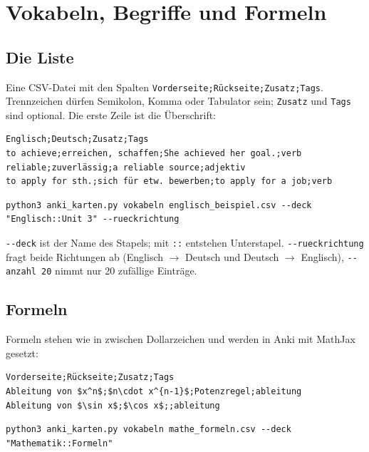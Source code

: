 \section{Vokabeln, Begriffe und Formeln}


\subsection{Die Liste}

Eine CSV-Datei mit den Spalten \texttt{Vorderseite;Rückseite;Zusatz;Tags}. Trennzeichen dürfen Semikolon, Komma oder Tabulator sein; \texttt{Zusatz} und \texttt{Tags} sind optional. Die erste Zeile ist die Überschrift:

\begin{lstlisting}[style=latex]
Englisch;Deutsch;Zusatz;Tags
to achieve;erreichen, schaffen;She achieved her goal.;verb
reliable;zuverlässig;a reliable source;adjektiv
to apply for sth.;sich für etw. bewerben;to apply for a job;verb
\end{lstlisting}

\begin{lstlisting}[style=latex]
python3 anki_karten.py vokabeln englisch_beispiel.csv --deck "Englisch::Unit 3" --rueckrichtung
\end{lstlisting}

\texttt{-{}-deck} ist der Name des Stapels; mit \texttt{::} entstehen Unterstapel. \texttt{-{}-rueckrichtung} fragt beide Richtungen ab (Englisch $\to$ Deutsch und Deutsch $\to$ Englisch), \texttt{-{}-anzahl 20} nimmt nur 20 zufällige Einträge.


\subsection{Formeln}

Formeln stehen wie in  zwischen Dollarzeichen und werden in Anki mit MathJax gesetzt:

\begin{lstlisting}[style=latex]
Vorderseite;Rückseite;Zusatz;Tags
Ableitung von $x^n$;$n\cdot x^{n-1}$;Potenzregel;ableitung
Ableitung von $\sin x$;$\cos x$;;ableitung
\end{lstlisting}

\begin{lstlisting}[style=latex]
python3 anki_karten.py vokabeln mathe_formeln.csv --deck "Mathematik::Formeln"
\end{lstlisting}


